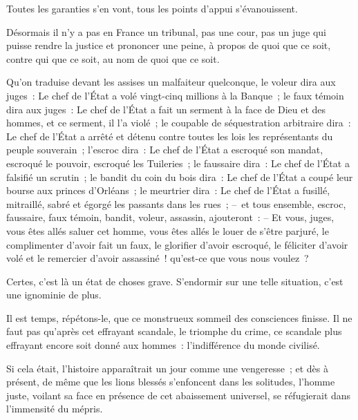 \documentclass[french,twoside]{book} %
\begin{document}
Toutes les garanties s’en vont, tous les points d’appui s’évanouissent.\par
Désormais il n’y a pas en France un tribunal, pas une cour, pas un juge qui puisse rendre la justice et prononcer une peine, à propos de quoi que ce soit, contre qui que ce soit, au nom de quoi que ce soit.\par
Qu’on traduise devant les assises un malfaiteur quelconque, le voleur dira aux juges : Le chef de l’État a volé vingt-cinq millions à la Banque ; le faux témoin dira aux juges : Le chef de l’État a fait un serment à la face de Dieu et des hommes, et ce serment, il l’a violé ; le coupable de séquestration arbitraire dira : Le chef de l’État a arrêté et détenu contre toutes les lois les représentants du peuple souverain ; l’escroc dira : Le chef de l’État a escroqué son mandat, escroqué le pouvoir, escroqué les Tuileries ; le faussaire dira : Le chef de l’État a falsifié un scrutin ; le bandit du coin du bois dira : Le chef de l’État a coupé leur bourse aux princes d’Orléans ; le meurtrier dira : Le chef de l’État a fusillé, mitraillé, sabré et égorgé les passants dans les rues ; – et tous ensemble, escroc, faussaire, faux témoin, bandit, voleur, assassin, ajouteront : – Et vous, juges, vous êtes allés saluer cet homme, vous êtes allés le louer de s’être parjuré, le complimenter d’avoir fait un faux, le glorifier d’avoir escroqué, le féliciter d’avoir volé et le remercier d’avoir assassiné ! qu’est-ce que vous nous voulez ?\par
Certes, c’est là un état de choses grave. S’endormir sur une telle situation, c’est une ignominie de plus.\par
Il est temps, répétons-le, que ce monstrueux sommeil des consciences finisse. Il ne faut pas qu’après cet effrayant scandale, le triomphe du crime, ce scandale plus effrayant encore soit donné aux hommes : l’indifférence du monde civilisé.\par
Si cela était, l’histoire apparaîtrait un jour comme une vengeresse ; et dès à présent, de même que les lions blessés s’enfoncent dans les solitudes, l’homme juste, voilant sa face en présence de cet abaissement universel, se réfugierait dans l’immensité du mépris.
\end{document}
